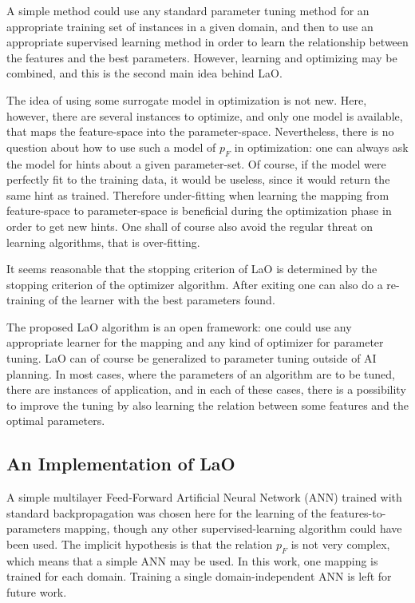 \documentclass{MYsig-alternate}
\begin{document}
A simple method could use any standard parameter tuning method for an appropriate training set of instances in a given domain, and then to use an appropriate supervised learning method in order to learn the relationship between the features and the best parameters. However, learning and optimizing may be combined, and this is the second main idea behind LaO.

The idea of using some surrogate model in optimization is not new. Here, however, there are  several instances to optimize, and only one model is available, that maps the feature-space into the parameter-space. Nevertheless, there is no question about how to use such a model of \begin{math}p_F\end{math} in optimization: one can always ask the model for hints about a given parameter-set. Of course, if the model were perfectly fit to the training data, it would be useless, since it would return the same hint as trained. Therefore under-fitting when learning the mapping from feature-space to parameter-space is beneficial during the optimization phase in order to get new hints. One shall of course also avoid the regular threat on learning algorithms, that is over-fitting.

It seems reasonable that the stopping criterion of LaO is determined by the stopping criterion of the optimizer algorithm. After exiting one can also do a re-training of the learner with the best parameters found.

The proposed LaO algorithm is an open framework: one could use any appropriate learner for the mapping and any kind of optimizer for parameter tuning. LaO can of course be generalized to parameter tuning outside of AI planning. In most cases, where the parameters of an algorithm are to be tuned, there are instances of application, and in each of these cases, there is a possibility to improve the tuning by also learning the relation between some features and the optimal parameters.

\subsection{An Implementation of LaO}

A simple multilayer Feed-Forward Artificial Neural Network (ANN) trained with standard backpropagation was chosen here for the learning of the features-to-parameters mapping, though any other supervised-learning algorithm could have been used. The implicit hypothesis is that the relation \begin{math}p_F\end{math} is not very complex, which means that a simple ANN may be used. In this work, one mapping is trained for each domain. Training a single domain-independent ANN is left for future work.
\end{document}
